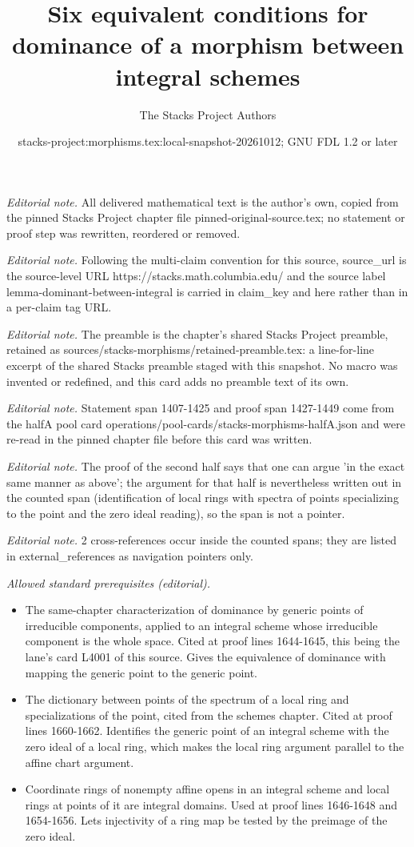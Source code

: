 \documentclass[10pt,a4paper]{amsart}
\title{Six equivalent conditions for dominance of a morphism between integral schemes}
\author{The Stacks Project Authors}
\date{stacks-project:morphisms.tex:local-snapshot-20261012; GNU FDL 1.2 or later}
\theoremstyle{plain}
\theoremstyle{definition}
\theoremstyle{remark}
\numberwithin{equation}{subsection}
\begin{document}
\maketitle
\noindent\textit{Editorial note.} All delivered mathematical text is the author's own, copied from the pinned Stacks Project chapter file pinned-original-source.tex; no statement or proof step was rewritten, reordered or removed.\par\medskip
\noindent\textit{Editorial note.} Following the multi-claim convention for this source, source\_url is the source-level URL https://stacks.math.columbia.edu/ and the source label lemma-dominant-between-integral is carried in claim\_key and here rather than in a per-claim tag URL.\par\medskip
\noindent\textit{Editorial note.} The preamble is the chapter's shared Stacks Project preamble, retained as sources/stacks-morphisms/retained-preamble.tex: a line-for-line excerpt of the shared Stacks preamble staged with this snapshot. No macro was invented or redefined, and this card adds no preamble text of its own.\par\medskip
\noindent\textit{Editorial note.} Statement span 1407-1425 and proof span 1427-1449 come from the halfA pool card operations/pool-cards/stacks-morphisms-halfA.json and were re-read in the pinned chapter file before this card was written.\par\medskip
\noindent\textit{Editorial note.} The proof of the second half says that one can argue 'in the exact same manner as above'; the argument for that half is nevertheless written out in the counted span (identification of local rings with spectra of points specializing to the point and the zero ideal reading), so the span is not a pointer.\par\medskip
\noindent\textit{Editorial note.} 2 cross-references occur inside the counted spans; they are listed in external\_references as navigation pointers only.\par\medskip
\noindent\textit{Allowed standard prerequisites (editorial).}\begin{itemize}
\item The same-chapter characterization of dominance by generic points of irreducible components, applied to an integral scheme whose irreducible component is the whole space. Cited at proof lines 1644-1645, this being the lane's card L4001 of this source. Gives the equivalence of dominance with mapping the generic point to the generic point.
\item The dictionary between points of the spectrum of a local ring and specializations of the point, cited from the schemes chapter. Cited at proof lines 1660-1662. Identifies the generic point of an integral scheme with the zero ideal of a local ring, which makes the local ring argument parallel to the affine chart argument.
\item Coordinate rings of nonempty affine opens in an integral scheme and local rings at points of it are integral domains. Used at proof lines 1646-1648 and 1654-1656. Lets injectivity of a ring map be tested by the preimage of the zero ideal.
\end{itemize}\medskip
\end{document}
